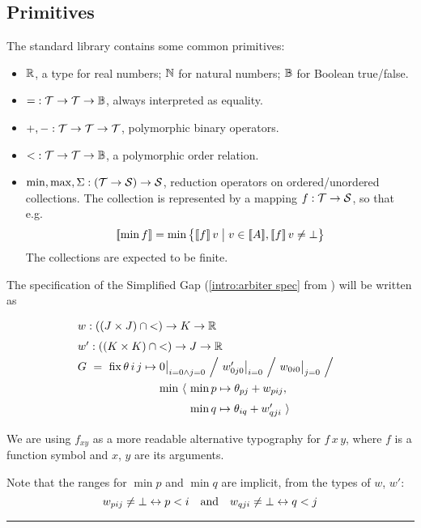 \subsection{Primitives}

The standard library contains some common primitives:

\begin{itemize}
  \item $\mathbb{R}$, a type for real numbers; $\mathbb{N}$ for natural numbers; $\mathbb{B}$ for Boolean true/false.
  \item ${=} : \mathcal{T}\to\mathcal{T}\to\mathbb{B}$, always interpreted as equality.
  \item ${+}, {-} : \mathcal{T}\to\mathcal{T}\to\mathcal{T}$, polymorphic binary operators.
  \item ${<} : \mathcal{T}\to\mathcal{T}\to\mathbb{B}$, a polymorphic order relation.
  \item $\min, \max, \Sigma : (\mathcal{T}\to\mathcal{S})\to\mathcal{S}$, reduction operators
    on ordered/unordered collections. The collection is represented by a mapping $f : \mathcal{T}\to\mathcal{S}$,
    so that e.g. \[\semp{\min f} = \min \big\{\semp{f}\,v \;\big|\; v\in\semp{A}, \semp{f}\,v\neq\bot\big\}\]
    The collections are expected to be finite.
\end{itemize}

\exampleTitle
\begin{comment}\subsection{Example}\end{comment}

The specification of the Simplified Gap (\eqref{intro:arbiter spec} from ) will be written as
%
\begin{equation}
  \renewcommand\arraystretch{1.5}
  \begin{array}{@{}l@{}l@{}l@{}}
    \lspan3{w : ((J\times J)\cap{<})\to K\to\R} \\
    \lspan3{w' : ((K\times K)\cap{<})\to J\to\R} \\
    G ~=~ \fix \theta\,i\,j\mapsto{}
      & \lspan2{0\big|_{i=0\land j=0} ~\Big/~ w'_{0j0}\big|_{i=0} ~\Big/~ w_{0i0}\big|_{j=0} ~\Big/~} \\
      & \min~\langle~ & \min p\mapsto\theta_{pj}+w_{pij}, \\
      & & \min q\mapsto\theta_{iq}+w'_{qji} ~\rangle
  \end{array}
  \label{lang:arbiter spec}
\end{equation}

\medskip
We are using $f_{xy}$
as a more readable alternative typography for $f\,x\,y$,
where $f$ is a function symbol and $x$, $y$ are its arguments.

Note that the ranges for $\min p$ and $\min q$ are implicit, from the types of
$w$, $w'$: \[w_{pij}\neq\bot\leftrightarrow p<i \quad \mbox{and} \quad w_{qji}\neq\bot\leftrightarrow q<j\]

\medskip
\hrule
